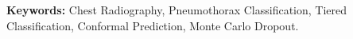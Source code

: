 \documentclass[12pt,a4paper,oneside]{report}
\begin{document}
\vspace{1cm}
\noindent \textbf{Keywords:} Chest Radiography, Pneumothorax Classification, Tiered Classification, Conformal Prediction, Monte Carlo Dropout.

\newpage

\tableofcontents
\listoffigures
\listoftables

\newpage
{}











\end{document}
